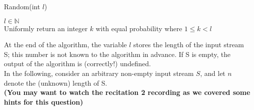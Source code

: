 \documentclass{article}
\begin{document}
\begin{algorithm}
\caption{Random(int $l$)}\label{alg:cap}
\begin{algorithmic}
\Require $l \in \mathbb{N}$\\
Uniformly return an integer $k$ with equal probability where $1\leq k < l $
\end{algorithmic}
\end{algorithm}

At the end of the algorithm, the variable $l$ stores the length of the input stream S; this number is not known to the algorithm in advance. If S is empty, the output of the algorithm is (correctly!) undefined.\\
In the following, consider an arbitrary non-empty input stream $S$, and let $n$ denote the (unknown) length of S. \\
\textbf{(You may want to watch the recitation 2 recording as we covered some hints for this question)}
\newpage
\end{document}
